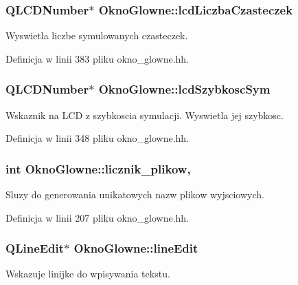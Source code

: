 \subsubsection[{lcd\+Liczba\+Czasteczek}]{\setlength{\rightskip}{0pt plus 5cm}Q\+L\+C\+D\+Number$\ast$ Okno\+Glowne\+::lcd\+Liczba\+Czasteczek\hspace{0.3cm}{\ttfamily [private]}}\label{class_okno_glowne_adbdd9fc009725804e015d267dc8375dc}
Wyswietla liczbe symulowanych czasteczek. 

Definicja w linii 383 pliku okno\+\_\+glowne.\+hh.

\hypertarget{class_okno_glowne_ab100c00d4ba33d896fd0985ac366296a}{}
\subsubsection[{lcd\+Szybkosc\+Sym}]{\setlength{\rightskip}{0pt plus 5cm}Q\+L\+C\+D\+Number$\ast$ Okno\+Glowne\+::lcd\+Szybkosc\+Sym\hspace{0.3cm}{\ttfamily [private]}}\label{class_okno_glowne_ab100c00d4ba33d896fd0985ac366296a}
Wskaznik na L\+C\+D z szybkoscia symulacji. Wyswietla jej szybkosc. 

Definicja w linii 348 pliku okno\+\_\+glowne.\+hh.

\hypertarget{class_okno_glowne_ae615cbd9c9f9ab06b365c4692ff68729}{}
\subsubsection[{licznik\+\_\+plikow}]{\setlength{\rightskip}{0pt plus 5cm}int Okno\+Glowne\+::licznik\+\_\+plikow\hspace{0.3cm}{\ttfamily [static]}, {\ttfamily [private]}}\label{class_okno_glowne_ae615cbd9c9f9ab06b365c4692ff68729}
Sluzy do generowania unikatowych nazw plikow wyjsciowych. 

Definicja w linii 207 pliku okno\+\_\+glowne.\+hh.

\hypertarget{class_okno_glowne_a0112b8be70a26552b03f38fab43a3301}{}
\subsubsection[{line\+Edit}]{\setlength{\rightskip}{0pt plus 5cm}Q\+Line\+Edit$\ast$ Okno\+Glowne\+::line\+Edit\hspace{0.3cm}{\ttfamily [private]}}\label{class_okno_glowne_a0112b8be70a26552b03f38fab43a3301}
Wskazuje linijke do wpisywania tekstu. 

